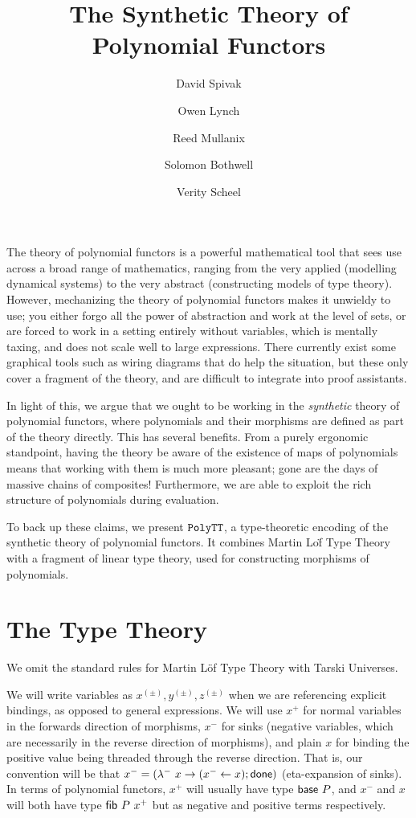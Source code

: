 \documentclass[final]{amsart}
\title{The Synthetic Theory of Polynomial Functors}
\author{David Spivak}
\author{Owen Lynch}
\author{Reed Mullanix}
\author{Solomon Bothwell}
\author{Verity Scheel}
\begin{document}
\maketitle
The theory of polynomial functors is a powerful mathematical tool that sees
use across a broad range of mathematics, ranging from the very applied
(modelling dynamical systems) to the very abstract (constructing models of type theory).
However, mechanizing the theory of polynomial functors makes it unwieldy to use; you
either forgo all the power of abstraction and work at the level of sets,
or are forced to work in a setting entirely without variables, which is mentally taxing,
and does not scale well to large expressions. There currently exist some graphical tools
such as wiring diagrams that do help the situation, but these only cover a fragment of
the theory, and are difficult to integrate into proof assistants.

In light of this, we argue that we ought to be working in the \emph{synthetic} theory
of polynomial functors, where polynomials and their morphisms are defined as part of the
theory directly. This has several benefits. From a purely ergonomic standpoint, having
the theory be aware of the existence of maps of polynomials means that working with
them is much more pleasant; gone are the days of massive chains of composites! Furthermore,
we are able to exploit the rich structure of polynomials during evaluation.

To back up these claims, we present $\texttt{PolyTT}$, a type-theoretic encoding of the synthetic
theory of polynomial functors. It combines Martin Lo\"f Type Theory with a fragment of
linear type theory, used for constructing morphisms of polynomials.

\section{The Type Theory}

We omit the standard rules for Martin L\"of Type Theory with Tarski Universes.

\begin{remark}
We will write variables as $x^{(\pm)}, y^{(\pm)}, z^{(\pm)}$ when we are referencing explicit bindings, as opposed to general expressions.
We will use $x^{+}$ for normal variables in the forwards direction of morphisms, $x^{-}$ for sinks (negative variables, which are necessarily in the reverse direction of morphisms), and plain $x$ for binding the positive value being threaded through the reverse direction.
That is, our convention will be that $x^{-} = (\lambda^{-}\ x \to (x^{-} \leftarrow x); \mathsf{done})$ (eta-expansion of sinks).
In terms of polynomial functors, $x^{+}$ will usually have type $\mathsf{base}\ P$, and $x^{-}$ and $x$ will both have type $\mathsf{fib}\ P\ x^{+}$ but as negative and positive terms respectively.
\end{remark}
\end{document}
